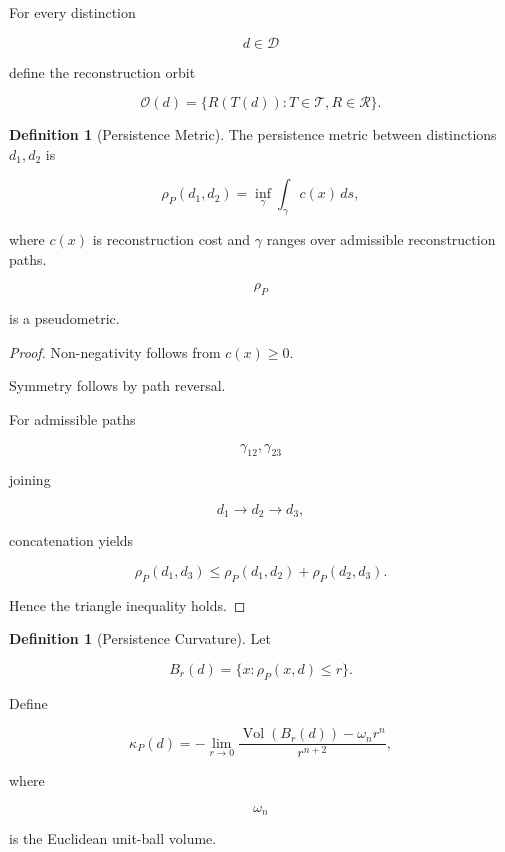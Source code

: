 \documentclass[12pt,oneside]{article}
\theoremstyle{definition}
\newtheorem{definition}[theorem]{Definition} \newtheorem{axiom}[theorem]{Axiom} \newtheorem{remark}[theorem]{Remark} \newtheorem{example}[theorem]{Example}
\begin{document}
For every distinction

\[
d \in \mathcal D
\]

define the reconstruction orbit

\[
\mathcal O(d)
=
\{
R(T(d))
:
T\in\mathcal T,
R\in\mathcal R
\}.
\]

\begin{definition}[Persistence Metric]

The persistence metric between distinctions
\(d_1,d_2\)
is

\[
\rho_P(d_1,d_2)
=
\inf_{\gamma}
\int_\gamma
c(x)\,ds,
\]

where \(c(x)\) is reconstruction cost
and \(\gamma\) ranges over admissible reconstruction paths.

\end{definition}

\begin{proposition}

\[
\rho_P
\]

is a pseudometric.

\end{proposition}

\begin{proof}

Non-negativity follows from
\(c(x)\ge0\).

Symmetry follows by path reversal.

For admissible paths

\[
\gamma_{12},
\gamma_{23}
\]

joining

\[
d_1\to d_2
\to d_3,
\]

concatenation yields

\[
\rho_P(d_1,d_3)
\le
\rho_P(d_1,d_2)
+
\rho_P(d_2,d_3).
\]

Hence the triangle inequality holds.

\end{proof}

\begin{definition}[Persistence Curvature]

Let

\[
B_r(d)
=
\{
x:
\rho_P(x,d)\le r
\}.
\]

Define

\[
\kappa_P(d)
=
-
\lim_{r\to0}
\frac{
\operatorname{Vol}(B_r(d))
-
\omega_n r^n
}
{r^{n+2}},
\]

where

\[
\omega_n
\]

is the Euclidean unit-ball volume.

\end{definition}
\end{document}
